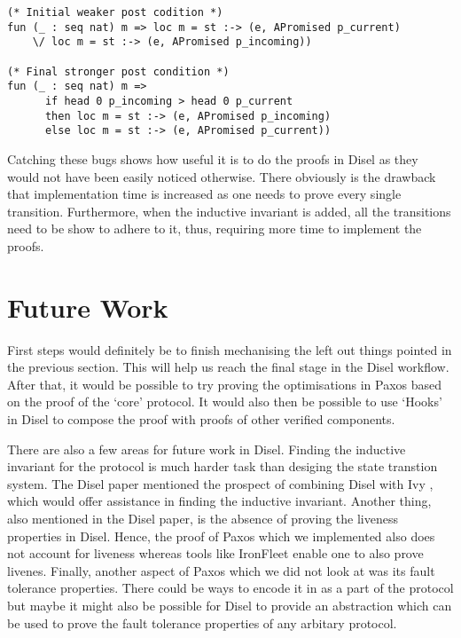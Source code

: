 \begin{lstlisting}
(* Initial weaker post codition *)
fun (_ : seq nat) m => loc m = st :-> (e, APromised p_current)
    \/ loc m = st :-> (e, APromised p_incoming))

(* Final stronger post condition *)
fun (_ : seq nat) m =>
      if head 0 p_incoming > head 0 p_current
      then loc m = st :-> (e, APromised p_incoming)
      else loc m = st :-> (e, APromised p_current))
\end{lstlisting}


Catching these bugs shows how useful it is to do the proofs in Disel as they
would not have been easily noticed otherwise.
There obviously is the drawback that implementation time is increased as one
needs to prove every single transition. Furthermore, when the inductive
invariant is added, all the transitions need to be show to adhere to it,
thus, requiring more time to implement the proofs.


\section{Future Work}
First steps would definitely be to finish mechanising the left out things
pointed in the previous section. This will help us reach the final stage in the Disel
workflow. After that, it would be possible to try proving the optimisations
in Paxos based on the proof of the `core' protocol. It would also then be possible
to use `Hooks' \cite{9} in Disel to compose the proof with proofs of other
verified components.

There are also a few areas for future work in Disel.
Finding the inductive invariant for the protocol is much harder task than
desiging the state transtion system. The Disel paper \cite{9} mentioned the prospect
of combining Disel with Ivy \cite{19}, which would offer assistance in finding
the inductive invariant. Another thing, also mentioned in the Disel paper, is
the absence of proving the liveness properties in Disel. Hence, the proof of
Paxos which we implemented also does not account for liveness whereas tools like
IronFleet \cite{15} enable one to also prove livenes.
Finally, another aspect of Paxos which we did not look at was its fault
tolerance properties. There could be ways to encode it in as a part of the
protocol but maybe it might also be possible for Disel to provide an
abstraction which can be used to prove the fault tolerance properties of
any arbitary protocol.

